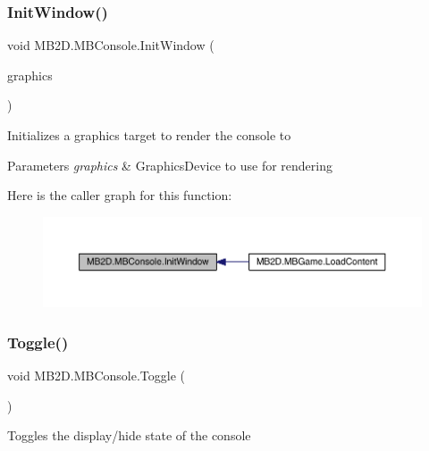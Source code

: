 \subsubsection{\texorpdfstring{Init\+Window()}{InitWindow()}}
{\footnotesize\ttfamily void M\+B2\+D.\+M\+B\+Console.\+Init\+Window (\begin{DoxyParamCaption}\item[{Graphics\+Device}]{graphics }\end{DoxyParamCaption})\hspace{0.3cm}{\ttfamily [inline]}}



Initializes a graphics target to render the console to 


\begin{DoxyParams}{Parameters}
{\em graphics} & Graphics\+Device to use for rendering\\
\hline
\end{DoxyParams}
Here is the caller graph for this function\+:\nopagebreak
\begin{figure}[H]
\begin{center}
\leavevmode
\includegraphics[width=350pt]{class_m_b2_d_1_1_m_b_console_a745ef1f55523b29b83d4d94c1fe5400b_icgraph}
\end{center}
\end{figure}
\hypertarget{class_m_b2_d_1_1_m_b_console_aab4c284a98afb148e35cf28e6d8ba0fc}{}\label{class_m_b2_d_1_1_m_b_console_aab4c284a98afb148e35cf28e6d8ba0fc} 
\subsubsection{\texorpdfstring{Toggle()}{Toggle()}}
{\footnotesize\ttfamily void M\+B2\+D.\+M\+B\+Console.\+Toggle (\begin{DoxyParamCaption}{ }\end{DoxyParamCaption})\hspace{0.3cm}{\ttfamily [inline]}}



Toggles the display/hide state of the console 

